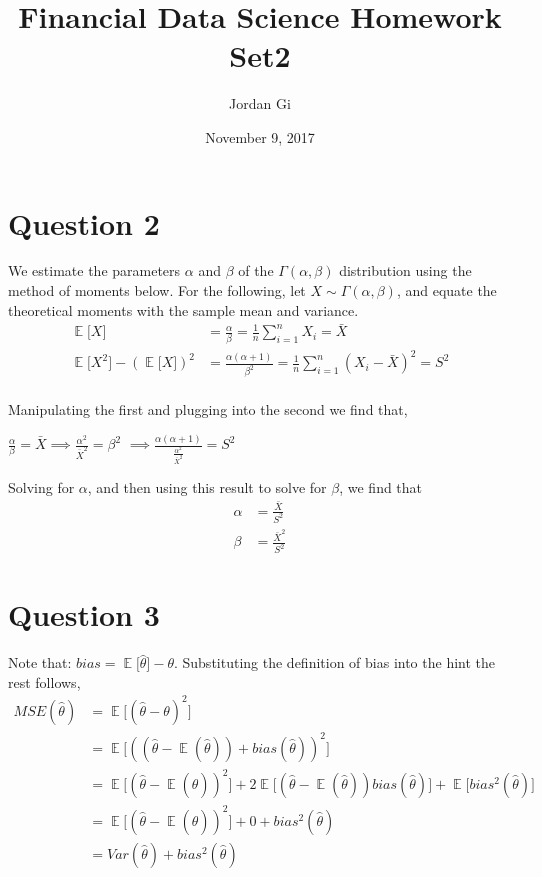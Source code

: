 \documentclass[12pt]{article}
\title{Financial Data Science Homework Set2}
\author{
Jordan Gi
}
\date{November 9, 2017}
\DeclareMathOperator{\EX}{\mathbb{E}}%
\begin{document}
\maketitle

\section*{Question 2}

We estimate the parameters $\alpha$ and $\beta$ of the $\Gamma(\alpha,\beta)$ distribution using the method of moments below. For the following, let 
$X \sim \Gamma(\alpha,\beta)$, and equate the theoretical moments with the sample mean and variance. 
		\begin{align*} 
			\EX\big[X\big] &= \frac{\alpha}{\beta} = \frac{1}{n} \sum_{i=1}^{n}X_{i} = \bar{X} \\
			\EX\big[X^2\big] - (\EX\big[X\big])^2 &= \frac{\alpha(\alpha+1)}{\beta^2} = \frac{1}{n} \sum_{i=1}^{n} (X_{i} - \bar{X})^2 = S^2 \\
		\end{align*}
		
Manipulating the first and plugging into the second we find that, 
		\begin{center} 
			$\frac{\alpha}{\beta} = \bar{X} \implies \frac{\alpha^2}{\bar{X}^2} = \beta^2$
			$\implies \frac{\alpha(\alpha+1)}{\frac{\alpha^2}{\bar{X}^2}} = S^2$
		\end{center}
		
Solving for $\alpha$, and then using this result to solve for $\beta$, we find that 
		\begin{align*} 
			 \alpha &= \frac{\bar{X}}{S^2} \\ 
			 \beta  &= \frac{\bar{X}^2}{S^2}
		\end{align*}


\section*{Question 3}

Note that: $bias = \EX\big[\widehat{\theta}\big] - \theta$. Substituting the definition of bias into the hint the rest follows,
		\begin{align*} 
			MSE(\widehat{\theta}) 								  &= \EX\big[(\widehat{\theta} - \theta)^2\big] \\
																			      &= \EX\big[((\widehat{\theta} - \EX(\widehat{\theta})) + bias(\widehat{\theta}))^2\big]  \\ 
																				  &= \EX\big[(\widehat{\theta} - \EX(\widehat{\theta}))^2\big] + 
																				  2\EX\big[(\widehat{\theta} - \EX(\widehat{\theta}))bias(\widehat{\theta})\big] +
																				  \EX\big[bias^2(\widehat{\theta})\big] \\
																				  &= \EX\big[(\widehat{\theta} - \EX(\widehat{\theta}))^2\big] + 
																				  0 +
																				  bias^2(\widehat{\theta}) \\
																				  &= Var(\widehat{\theta}) + bias^2(\widehat{\theta})
		\end{align*}
\end{document}
